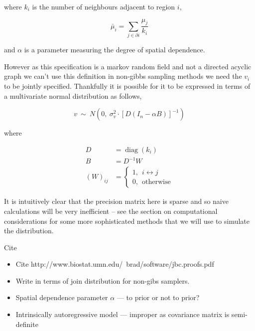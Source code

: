 \documentclass{article}
\begin{document}
where $k_i$ is the number of neighbours adjacent to region $i$,

\begin{equation}
\bar{\mu}_i = \sum_{j \in \partial i} \frac{\mu_j}{k_i}
\end{equation}

and $\alpha$ is a parameter measuring the degree of spatial dependence. 

However as this specification is a markov random field and not a directed acyclic graph we can't use this definition in non-gibbs sampling methods \- we need the $v_i$ to be jointly specified. Thankfully it is possible for it to be expressed in terms of a multivariate normal distribution as follows,

\begin{equation}
v \ \sim \ N(0, \ \sigma_v^2 \cdot {[D(I_n - \alpha B)]}^{-1})
\end{equation}

where

\begin{align}
D &= \operatorname{diag}(k_i) \\
B &= D^{-1} W \\
{(W)}_{ij} &= 
\begin{cases}
1, \ \ i \leftrightarrow j \\
0, \ \ \textrm{otherwise}
\end{cases}
\end{align} 

It is intuitively clear that the precision matrix here is sparse and so naive calculations will be very inefficient -- see the section on computational considerations for some more sophisticated methods that we will use to simulate the distribution.

Cite \cite{car}

\begin{itemize}

\item Cite http://www.biostat.umn.edu/~brad/software/jbc.proofs.pdf

\item Write in terms of join distribution for non-gibs samplers.

\item Spatial dependence parameter $\alpha$ --- to prior or not to prior?

\item Intrinsically autoregressive model --- improper as covariance matrix is semi-definite

\end{itemize}
\end{document}
